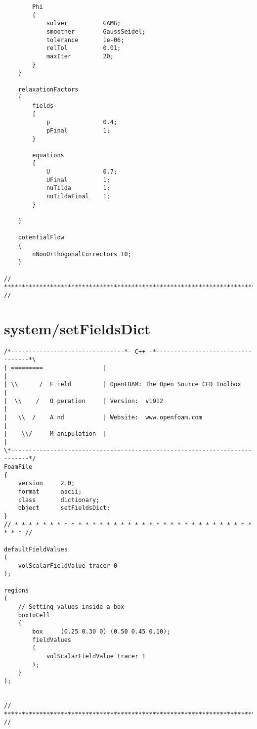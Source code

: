 \begin{lstlisting}
		Phi
		{
			solver          GAMG;
			smoother        GaussSeidel;
			tolerance       1e-06;
			relTol          0.01;
          	maxIter         20;
		}
    }

    relaxationFactors
	{
		fields
		{
			p				0.4;
			pFinal			1;
		}
	
		equations
		{
			U				0.7;
			UFinal			1;
			nuTilda			1;
			nuTildaFinal	1;            
		}
	
	}
	
	potentialFlow
	{
		nNonOrthogonalCorrectors 10;
	}

// ************************************************************************* //

\end{lstlisting}

\section{system/setFieldsDict}
\begin{lstlisting}
/*--------------------------------*- C++ -*----------------------------------*\
| =========                 |                                                 |
| \\      /  F ield         | OpenFOAM: The Open Source CFD Toolbox           |
|  \\    /   O peration     | Version:  v1912                                 |
|   \\  /    A nd           | Website:  www.openfoam.com                      |
|    \\/     M anipulation  |                                                 |
\*---------------------------------------------------------------------------*/
FoamFile
{
    version     2.0;
    format      ascii;
    class       dictionary;
    object      setFieldsDict;
}
// * * * * * * * * * * * * * * * * * * * * * * * * * * * * * * * * * * * * * //

defaultFieldValues
(
    volScalarFieldValue tracer 0
);

regions
(
    // Setting values inside a box
    boxToCell
    {
        box     (0.25 0.30 0) (0.50 0.45 0.10);
        fieldValues
        (
            volScalarFieldValue tracer 1
        );
    }
);


// ************************************************************************* //

\end{lstlisting}

